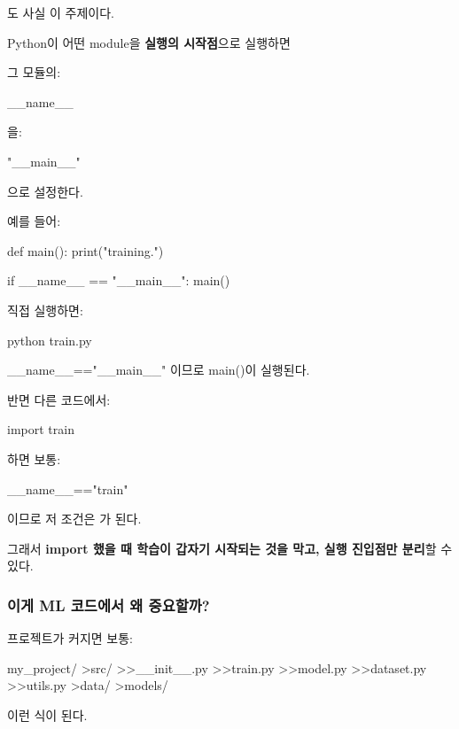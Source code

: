 도 사실 이 주제이다.

Python이 어떤 module을 \textbf{실행의 시작점}으로 실행하면

그 모듈의:

\begin{dhkzsh}
__name__
\end{dhkzsh}

을:

\begin{dhkzsh}
"__main__"
\end{dhkzsh}

으로 설정한다.

예를 들어:

\begin{dhkcode}
def main():
    print("training.")

if __name__ == "__main__":
    main()
\end{dhkcode}

직접 실행하면:

\begin{dhkzsh}
python train.py
\end{dhkzsh}

\begin{dhksmry}[centered]
__name__=="__main__" 이므로 main()이 실행된다.
\end{dhksmry}

반면 다른 코드에서:

\begin{dhkcode}
import train
\end{dhkcode}

하면 보통:

\begin{dhkzsh}
__name__=="train"
\end{dhkzsh}

이므로 저 조건은 가 된다.

그래서 \textbf{import 했을 때 학습이 갑자기 시작되는 것을 막고, 실행 진입점만 분리}할 수 있다.

\subsubsection{이게 ML 코드에서 왜 중요할까?}

프로젝트가 커지면 보통:

\begin{dhkdir}
my_project/
>src/
>>__init__.py
>>train.py
>>model.py
>>dataset.py
>>utils.py
>data/
>models/
\end{dhkdir}

이런 식이 된다.

